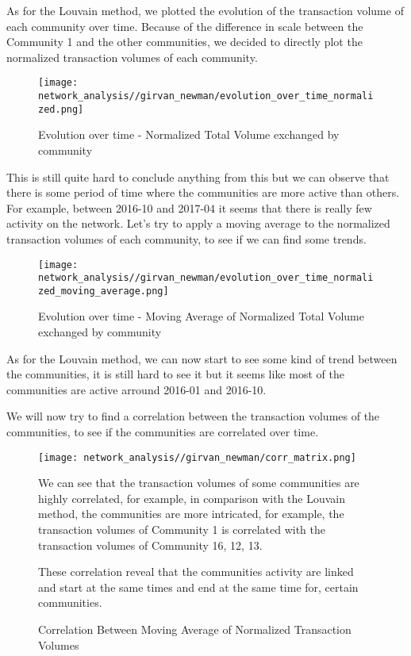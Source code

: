 \documentclass[a4paper, 12pt]{article}
\begin{document}
As for the Louvain method, we plotted the evolution of the transaction volume of each community over time. Because of the difference
in scale between the Community 1 and the other communities, we decided to directly plot the normalized transaction volumes of each community.

\begin{figure}[h]
    \centering
    \texttt{[image: network\_analysis//girvan\_newman/evolution\_over\_time\_normalized.png]}
    \caption{Evolution over time - Normalized Total Volume exchanged by community}
\end{figure}

This is still quite hard to conclude anything from this but we can observe that there is some period of time where the communities are more active than others.
For example, between 2016-10 and 2017-04 it seems that there is really few activity on the network.
Let's try to apply a moving average to the normalized transaction volumes of each community, to see if we can find some trends.

\begin{figure}[h]
    \centering
    \texttt{[image: network\_analysis//girvan\_newman/evolution\_over\_time\_normalized\_moving\_average.png]}
    \caption{Evolution over time - Moving Average of Normalized Total Volume exchanged by community}
\end{figure}

As for the Louvain method, we can now start to see some kind of trend between the communities, it is still hard to see it but it seems like
most of the communities are active arround 2016-01 and 2016-10. 

We will now try to find a correlation between the transaction volumes of the communities, to see if the communities are correlated over time.

\begin{figure}[h]
    \begin{minipage}{0.55\linewidth}
        \texttt{[image: network\_analysis//girvan\_newman/corr\_matrix.png]}
        \caption{Correlation Between Moving Average of Normalized Transaction Volumes}
        \label{fig:girvan_newman_correlation_matrix}
    \end{minipage}%
    \hspace{0.05\linewidth} %
    \begin{minipage}{0.40\linewidth}
        We can see that the transaction volumes of some communities are highly correlated, for example,
        in comparison with the Louvain method, the communities are more intricated, for example, 
        the transaction volumes of Community 1 is correlated with the transaction volumes of Community 16, 12, 13.
        
        These correlation reveal that the communities activity are linked and start at the same times and end at the same time for,
        certain communities. \\ 
        \vfill
    \end{minipage}
\end{figure}
\end{document}
